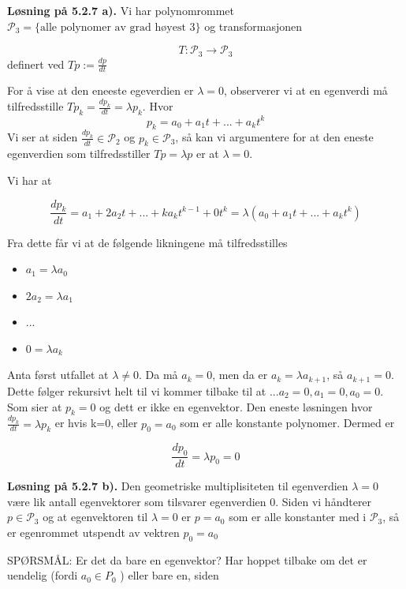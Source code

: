 \documentclass[a4paper,norsk]{article}
\newenvironment{oppgave}[1]%
	{\trivlist{}\item\relax\textbf{Løsning på #1.}\medspace}%
	{\endtrivlist}
\begin{document}
\begin{oppgave}{5.2.7 a)}
Vi har polynomrommet $ \mathcal{P}_3 = \{ \text{alle polynomer av grad høyest 3} \}$ og transformasjonen

\[
    T: \mathcal{P}_3 \rightarrow \mathcal{P}_3
\]
definert ved $ Tp := \frac{ dp }{ dt } $

For å vise at den eneeste egeverdien er $ \lambda = 0 $, observerer vi at en egenverdi må tilfredsstille $ Tp_k = \frac{ dp_k }{ dt } = \lambda p_k $. Hvor 
\[
    p_k = a_0 + a_1 t + ... + a_k t^k
\]
Vi ser at siden $ \frac{ dp_k }{ dt } \in \mathcal{P}_2 $ og $ p_k \in \mathcal{P}_3 $, så kan vi argumentere for at den eneste egenverdien som tilfredsstiller $ Tp =\lambda p $ er at $ \lambda = 0$.

Vi har at

\[
    \frac{ dp_k }{ dt } = a_1 + 2a_2t+...+ka_kt^{k-1} + 0t^k = \lambda \left( a_0 + a_1t+...+a_kt^k \right) 
\]

Fra dette får vi at de følgende likningene må tilfredsstilles
\begin{itemize}
    \item $ a_1=\lambda a_0 $
    \item $ 2a_2 = \lambda a_1 $
    \item ...
    \item $ 0 = \lambda a_k $   
\end{itemize}

Anta først utfallet at $ \lambda \neq 0 $. Da må $ a_k=0 $, men da er $ a_k= \lambda a_{k+1} $, så $ a_{k+1}=0 $. Dette følger rekursivt helt til vi kommer tilbake til at $ ...a_2=0, a_1=0, a_0=0 $. Som sier at $ p_k=0 $ og dett er ikke en egenvektor. Den eneste løsningen hvor $ \frac{ dp_k }{ dt } = \lambda p_k $ er hvis k=0, eller $ p_0 = a_0 $ som er alle konstante polynomer. Dermed er 

\[
    \frac{ dp_0 }{ dt }= \lambda p_0 = 0
\]

\end{oppgave}

\begin{oppgave}{5.2.7 b)}
Den geometriske multiplisiteten til egenverdien $ \lambda = 0 $ være lik antall egenvektorer som tilsvarer egenverdien 0. Siden vi håndterer $ p \in \mathcal{P}_3 $ og at egenvektoren til $ \lambda = 0 $ er $ p = a_0 $ som er alle konstanter med i $ \mathcal{P}_3 $, så er egenrommet utspendt av vektren $ p_0 = a_0 $

SPØRSMÅL: Er det da bare en egenvektor? Har hoppet tilbake om det er uendelig (fordi $ a_0 \in P_0 $ ) eller bare en, siden 
    
\end{oppgave}
\end{document}
